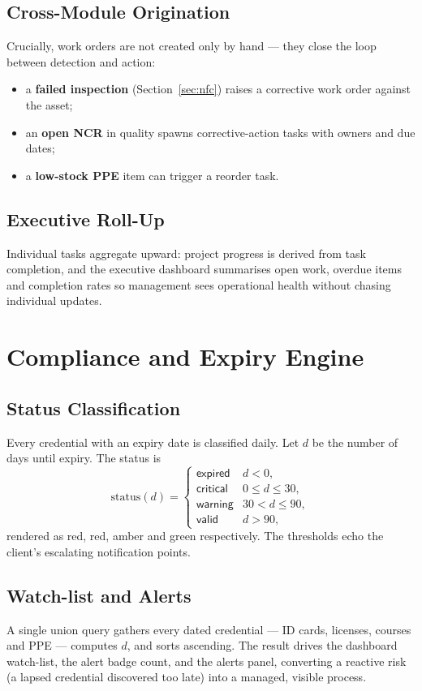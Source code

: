 \documentclass[11pt]{article}
\begin{document}
\subsection{Cross-Module Origination}
Crucially, work orders are not created only by hand --- they close the loop between detection and action:
\begin{itemize}
  \item a \textbf{failed inspection} (Section~\ref{sec:nfc}) raises a corrective work order against the asset;
  \item an \textbf{open NCR} in quality spawns corrective-action tasks with owners and due dates;
  \item a \textbf{low-stock PPE} item can trigger a reorder task.
\end{itemize}

\subsection{Executive Roll-Up}
Individual tasks aggregate upward: project progress is derived from task completion, and the executive
dashboard summarises open work, overdue items and completion rates so management sees operational health
without chasing individual updates.

\section{Compliance and Expiry Engine}
\subsection{Status Classification}
Every credential with an expiry date is classified daily. Let $d$ be the number of days until expiry.
The status is
\[
\text{status}(d)=
\begin{cases}
\textsf{expired}  & d < 0,\\[2pt]
\textsf{critical} & 0 \leq d \leq 30,\\[2pt]
\textsf{warning}  & 30 < d \leq 90,\\[2pt]
\textsf{valid}    & d > 90,
\end{cases}
\]
rendered as red, red, amber and green respectively. The thresholds echo the client's escalating
notification points.

\subsection{Watch-list and Alerts}
A single union query gathers every dated credential --- ID cards, licenses, courses and PPE --- computes
$d$, and sorts ascending. The result drives the dashboard watch-list, the alert badge count, and the
alerts panel, converting a reactive risk (a lapsed credential discovered too late) into a managed,
visible process.
\end{document}
